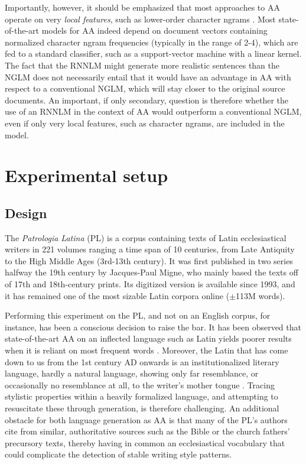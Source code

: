 \documentclass[11pt]{article}
\begin{document}
Importantly, however, it should be emphasized that most approaches to AA operate on very \emph{local features}, such as lower-order character ngrams \cite{stamatatos_law,sapkota-EtAl:2015,kestemont:2014}. Most state-of-the-art models for AA indeed depend on document vectors containing normalized character ngram frequencies (typically in the range of 2-4), which are fed to a standard classifier, such as a support-vector machine with a linear kernel. The fact that the RNNLM might generate more realistic sentences than the NGLM does not necessarily entail that it would have an advantage in AA with respect to a conventional NGLM, which will stay closer to the original source documents. An important, if only secondary, question is therefore whether the use of an RNNLM in the context of AA would outperform a conventional NGLM, even if only very local features, such as character ngrams, are included in the model.

\section{Experimental setup}\label{sec:exp}
\subsection{Design}
The \textit{Patrologia Latina} (PL) is a corpus containing texts of Latin ecclesiastical writers in 221 volumes ranging a time span of 10 centuries, from Late Antiquity to  the High Middle Ages (3rd-13th century). It was first published in two series halfway the 19th century by Jacques-Paul Migne, who mainly based the texts off of 17th and 18th-century prints. Its digitized version is available since 1993, and it has remained one of the most sizable Latin corpora online ($\pm$113M words). 

Performing this experiment on the PL, and not on an English corpus, for instance, has been a conscious decision to raise the bar. It has been observed that state-of-the-art AA on an inflected language such as Latin yields poorer results when it is reliant on most frequent words \cite{rybicki2011}. Moreover, the Latin that has come down to us from the 1st century AD onwards is an institutionalized literary language, hardly a natural language, showing only far resemblance, or occasionally no resemblance at all, to the writer's mother tongue \cite{maes2009}. Tracing stylistic properties within a heavily formalized language, and attempting to resuscitate these through generation, is therefore challenging. An additional obstacle for both language generation as AA is that many of the PL's authors cite from similar, authoritative sources such as the Bible or the church fathers' precursory texts, thereby having in common an ecclesiastical vocabulary that could complicate the detection of stable writing style patterns.
\end{document}
